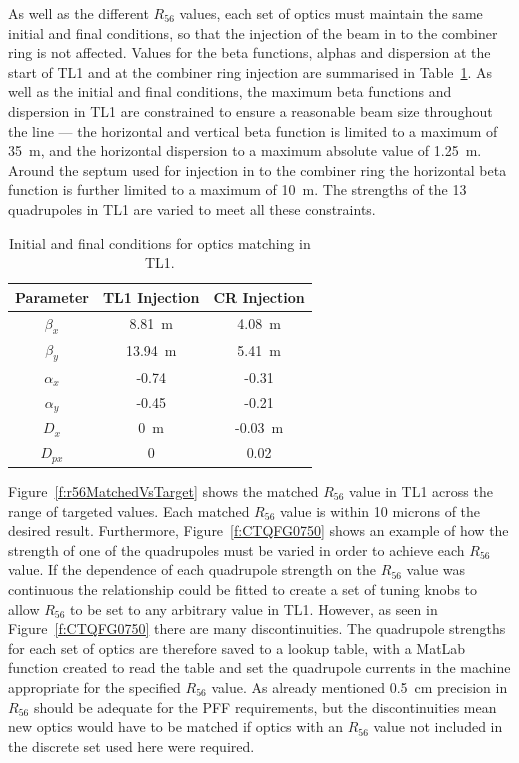As well as the different \(R_{56}\) values, each set of optics must maintain the same initial and final conditions, so that the injection of the beam in to the combiner ring is not affected. Values for the beta functions, alphas and dispersion at the start of TL1 and at the combiner ring injection are summarised in Table~\ref{t:tl1MatchParams}. As well as the initial and final conditions, the maximum beta functions and dispersion in TL1 are constrained to ensure a reasonable beam size throughout the line --- the horizontal and vertical beta function is limited to a maximum of 35~m, and the horizontal dispersion to a maximum absolute value of 1.25~m. Around the septum used for injection in to the combiner ring the horizontal beta function is further limited to a maximum of 10~m. The strengths of the 13 quadrupoles in TL1 are varied to meet all these constraints.

\begin{table}
  \begin{center}
    \begin{tabular}{| c c c |}
	   \hline
       Parameter & TL1 Injection & CR Injection \\ \hline
       \(\beta_x\) & 8.81~m & 4.08~m \\
       \(\beta_y\) & 13.94~m & 5.41~m \\
       \(\alpha_x\) & -0.74 & -0.31 \\
       \(\alpha_y\) & -0.45 & -0.21 \\ 
       \(D_x\) & 0~m & -0.03~m \\ 
       \(D_{px}\) & 0 & 0.02 \\ \hline
    \end{tabular}
    \caption{Initial and final conditions for optics matching in TL1.}
  	\label{t:tl1MatchParams}
  \end{center}
\end{table}

Figure~\ref{f:r56MatchedVsTarget} shows the matched \(R_{56}\) value in TL1 across the range of targeted values. Each matched \(R_{56}\) value is within 10 microns of the desired result. Furthermore, Figure~\ref{f:CTQFG0750}  shows an example of how the strength of one of the quadrupoles must be varied in order to achieve each \(R_{56}\) value. If the dependence of each quadrupole strength on the \(R_{56}\) value was continuous the relationship could be fitted to create a set of tuning knobs to allow \(R_{56}\) to be set to any arbitrary value in TL1. However, as seen in Figure~\ref{f:CTQFG0750} there are many discontinuities. The quadrupole strengths for each set of optics are therefore saved to a lookup table, with a MatLab function created to read the table and set the quadrupole currents in the machine appropriate for the specified \(R_{56}\) value. As already mentioned 0.5~cm precision in \(R_{56}\) should be adequate for the PFF requirements, but the discontinuities mean new optics would have to be matched if optics with an \(R_{56}\) value not included in the discrete set used here were required.

